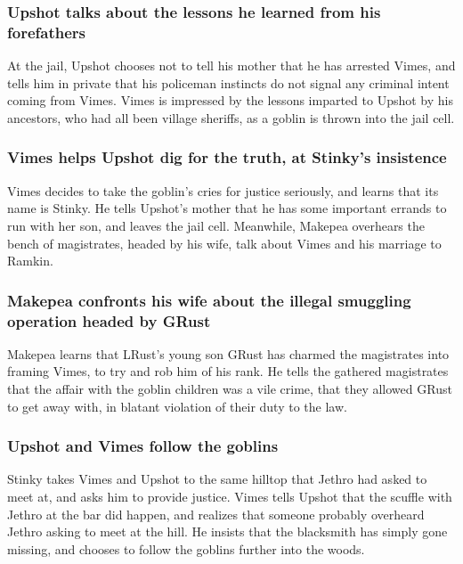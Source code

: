 \subsubsection{\Gls{Upshot} talks about the lessons he learned from his forefathers}
At the jail, \Gls{Upshot} chooses not to tell his mother that he has arrested \Gls{Vimes}, and
tells him in private that his policeman instincts do not signal any criminal intent coming from
\Gls{Vimes}. \Gls{Vimes} is impressed by the lessons imparted to \Gls{Upshot} by his ancestors, who
had all been village sheriffs, as a goblin is thrown into the jail cell.

\subsubsection{\Gls{Vimes} helps \Gls{Upshot} dig for the truth, at \Gls{Stinky}'s insistence}
\Gls{Vimes} decides to take the goblin's cries for justice seriously, and learns that its name is
\Gls{Stinky}. He tells \Gls{Upshot}'s mother that he has some important errands to run with her
son, and leaves the jail cell. Meanwhile, \Gls{Makepea} overhears the bench of magistrates,
headed by his wife, talk about \Gls{Vimes} and his marriage to \Gls{Ramkin}.

\subsubsection{\Gls{Makepea} confronts his wife about the illegal smuggling operation headed by
    \Gls{GRust}}
\Gls{Makepea} learns that \Gls{LRust}'s young son \Gls{GRust} has charmed the magistrates into
framing \Gls{Vimes}, to try and rob him of his rank. He tells the gathered magistrates that the
affair with the goblin children was a vile crime, that they allowed \Gls{GRust} to get away with,
in blatant violation of their duty to the law.

\subsubsection{\Gls{Upshot} and \Gls{Vimes} follow the goblins}
\Gls{Stinky} takes \Gls{Vimes} and \Gls{Upshot} to the same hilltop that \Gls{Jethro} had asked to
meet at, and asks him to provide justice. \Gls{Vimes} tells \Gls{Upshot} that the scuffle with
\Gls{Jethro} at the bar did happen, and realizes that someone probably overheard \Gls{Jethro} asking
to meet at the hill. He insists that the blacksmith has simply gone missing, and chooses to follow
the goblins further into the woods.

